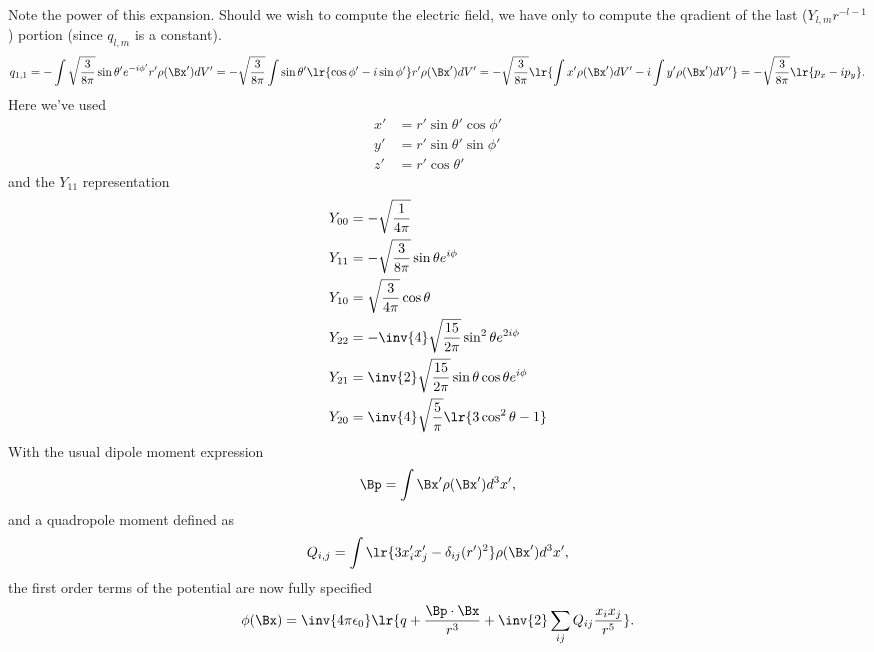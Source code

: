%
Note the power of this expansion.  Should we wish to compute the electric field, we have only to compute the qradient of  the last (\(Y_{l,m} r^{-l-1} \)) portion (since \( q_{l,m} \) is a constant).
%
\begin{dmath}\label{eqn:emtLecture8:520}
q_{1,1}
=
-\int \sqrt{\frac{3}{8 \pi}} \sin\theta' e^{-i\phi'} r' \rho(\Bx') dV'
=
-\sqrt{\frac{3}{8 \pi}} \int \sin\theta' \lr{ \cos\phi' - i\sin\phi'} r' \rho(\Bx') dV'
=
-\sqrt{\frac{3}{8 \pi}} \lr{
\int x' \rho(\Bx') dV'
-i \int y' \rho(\Bx') dV'
}
=
-\sqrt{\frac{3}{8 \pi}} \lr{
p_x - i p_y
}.
\end{dmath}
%
Here we've used
\begin{equation}\label{eqn:emtLecture8:540}
\begin{aligned}
x' &= r' \sin\theta' \cos\phi' \\
y' &= r' \sin\theta' \sin\phi' \\
z' &= r' \cos\theta'
\end{aligned}
\end{equation}
%
and the \( Y_{11} \) representation
%
\begin{equation}\label{eqn:emtLecture8:560}
\begin{aligned}
Y_{00} &= -\sqrt{\frac{1}{4 \pi}} \\
Y_{11} &= -\sqrt{\frac{3}{8 \pi}} \sin\theta e^{i\phi} \\
Y_{10} &=  \sqrt{\frac{3}{4 \pi}} \cos\theta  \\
Y_{22} &= -\inv{4} \sqrt{\frac{15}{2 \pi}} \sin^2\theta e^{2 i\phi} \\
Y_{21} &=  \inv{2} \sqrt{\frac{15}{2 \pi}} \sin\theta \cos\theta e^{i\phi} \\
Y_{20} &=  \inv{4} \sqrt{\frac{5}{\pi}} \lr{ 3 \cos^2\theta - 1 } \\
\end{aligned}
\end{equation}
%
%
With the usual dipole moment expression
%
\begin{dmath}\label{eqn:emtLecture8:580}
\Bp = \int \Bx' \rho(\Bx') d^3 x',
\end{dmath}
%
and a quadropole moment defined as
\begin{dmath}\label{eqn:emtLecture8:600}
Q_{i,j} = \int \lr{ 3 x_i' x_j' - \delta_{ij} (r')^2 } \rho(\Bx') d^3 x',
\end{dmath}
%
the first order terms of the potential are now fully specified
\begin{dmath}\label{eqn:emtLecture8:620}
\phi(\Bx)
=
\inv{4 \pi \epsilon_0}
\lr{
q + \frac{\Bp \cdot \Bx}{r^3} +
\inv{2} \sum_{ij} Q_{ij} \frac{x_i x_j}{r^5}
}.
\end{dmath}
